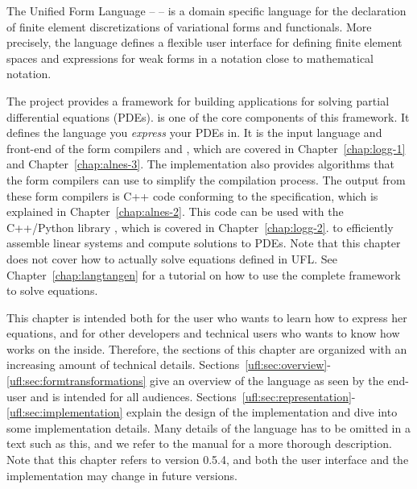 \index{\ufl{}}


The Unified Form Language -- \ufl{} \citep{AlnaesA.Logg2009} --
is a domain specific language for the declaration of finite element
discretizations of variational forms and functionals. More precisely,
the language defines a flexible user interface for defining finite
element spaces and expressions for weak forms in a notation close to
mathematical notation.

The \fenics{} project provides a framework for building applications
for solving partial differential equations (PDEs).  \ufl{} is one of
the core components of this framework.  It defines the language you
\emph{express} your PDEs in.  It is the input language and front-end
of the form compilers \ffc{} and \sfc{}, which are covered in
Chapter~\ref{chap:logg-1} and Chapter~\ref{chap:alnes-3}.  The \ufl{}
implementation also provides algorithms that the form compilers can
use to simplify the compilation process.  The output from these form
compilers is C++ \citep{Stroustrup1997} code conforming to the \ufc{}
specification, which is explained in Chapter~\ref{chap:alnes-2}.
This code can be used with the C++/Python library \dolfin{}, which
is covered in Chapter~\ref{chap:logg-2}.  to efficiently assemble
linear systems and compute solutions to PDEs.  Note that this chapter
does not cover how to actually solve equations defined in UFL. See
Chapter~\ref{chap:langtangen} for a tutorial on how to use the complete
\fenics{} framework to solve equations.

This chapter is intended both for the \fenics{} user who wants
to learn how to express her equations, and for other \fenics{}
developers and technical users who wants to know how \ufl{}
works on the inside.  Therefore, the sections of this chapter
are organized with an increasing amount of technical details.
Sections~\ref{ufl:sec:overview}-\ref{ufl:sec:formtransformations}
give an overview of the language as seen by
the end-user and is intended for all audiences.
Sections~\ref{ufl:sec:representation}-\ref{ufl:sec:implementation}
explain the design of the implementation and dive into some implementation
details.  Many details of the language has to be omitted in a text such
as this, and we refer to the \ufl{} manual \citep{AlnaesA.Logg2009} for
a more thorough description. Note that this chapter refers to \ufl{}
version 0.5.4, and both the user interface and the implementation may
change in future versions.

